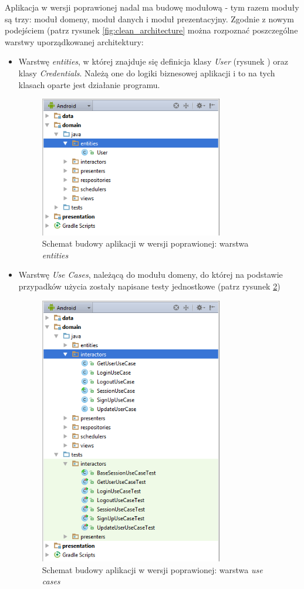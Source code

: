Aplikacja w wersji poprawionej nadal ma budowę modułową - tym razem moduły są trzy: moduł domeny, moduł danych i moduł prezentacyjny. Zgodnie z nowym podejściem (patrz rysunek \ref{fig:clean_architecture} można rozpoznać poszczególne warstwy uporządkowanej architektury:
\begin{itemize}
\item
Warstwę \textit{entities}, w której znajduje się definicja klasy \textit{User} (rysunek ) oraz klasy \textit{Credentials}. Należą one do logiki biznesowej aplikacji i to na tych klasach oparte jest działanie programu. 
\begin{figure}[!htb]
    \centering
    \includegraphics[width=8cm]{imgs/ch6_app_cl_entities.png}
    \caption
{Schemat budowy aplikacji w wersji poprawionej: warstwa \textit{entities}}
    \label{fig:app_cl_entities}
\end{figure} 

\item
Warstwę \textit{Use Cases}, należącą do modułu domeny, do której na podstawie przypadków użycia zostały napisane testy jednostkowe (patrz rysunek \ref{fig:app_cl_usecases})
\begin{figure}[!htb]
    \centering
    \includegraphics[width=8cm]{imgs/ch6_app_cl_usecases.png}
    \caption
{Schemat budowy aplikacji w wersji poprawionej: warstwa \textit{use cases}}
    \label{fig:app_cl_usecases}
\end{figure} 


\end{itemize}
